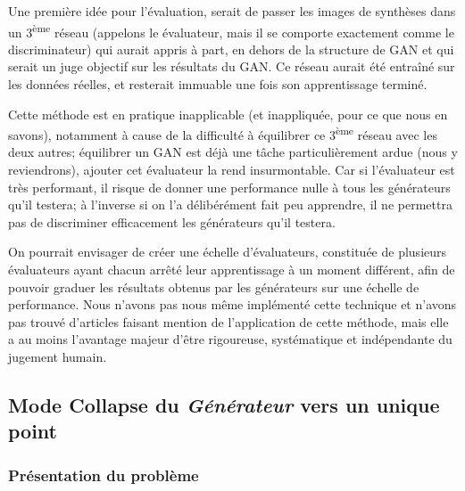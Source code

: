 Une première idée pour l'évaluation, serait de passer les images de synthèses dans un 3\textsuperscript{ème} réseau (appelons le évaluateur, mais il se comporte exactement comme le discriminateur) qui aurait appris à part, en dehors de la structure de GAN et qui serait un juge objectif sur les résultats du GAN. Ce réseau aurait été entraîné sur les données réelles, et resterait immuable une fois son apprentissage terminé. 

Cette méthode est en pratique inapplicable (et inappliquée, pour ce que nous en savons), notamment à cause de la difficulté à équilibrer ce 3\textsuperscript{ème} réseau avec les deux autres; équilibrer un GAN est déjà une tâche particulièrement ardue (nous y reviendrons), ajouter cet évaluateur la rend insurmontable. Car si l'évaluateur est très performant, il risque de donner une performance nulle à tous les générateurs qu'il testera; à l'inverse si on l'a délibérément fait peu apprendre, il ne permettra pas de discriminer efficacement les générateurs qu'il testera.

On pourrait envisager de créer une échelle d'évaluateurs, constituée de plusieurs évaluateurs ayant chacun arrêté leur apprentissage à un moment différent, afin de pouvoir graduer les résultats obtenus par les générateurs sur une échelle de performance. Nous n'avons pas nous même implémenté cette technique et n'avons pas trouvé d'articles faisant mention de l'application de cette méthode, mais elle a au moins l'avantage majeur d'être rigoureuse, systématique et indépendante du jugement humain.

\subsection{Mode Collapse du \textit{Générateur} vers un unique point}
\subsubsection{Présentation du problème}
\label{mode-collapse}

